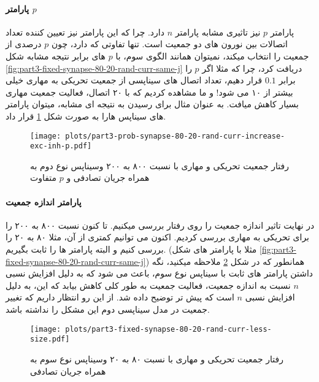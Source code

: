             \paragraph*{پارامتر $p$}
                پارامتر 
                $p$ 
                نیز تاثیری مشابه پارامتر 
                $n$ 
                دارد. چرا که این پارامتر نیز تعیین کننده تعداد اتصالات بین نورون های دو جمعیت است. تنها تفاوتی که دارد، چون 
                $p$ 
                درصدی از جمعیت را انتخاب میکند، نمیتوان همانند الگوی سوم، با 
                $p$ 
                های برابر نتیجه مشابه شکل
                \ref{fig:part3-fixed-synapse-80-20-rand-curr-same-j}
                دریافت کرد، چرا که مثلا اگر 
                $p$ 
                را برابر 
                $0.1$ 
                قرار دهیم، تعداد اتصال های سیناپسی از جمعیت تحریکی به مهاری خیلی بیشتر از ۱۰ می شود! و ما مشاهده کردیم که با ۲۰ اتصال، فعالیت جمعیت مهاری بسیار کاهش میافت. به عنوان مثال برای رسیدن به نتیجه ای مشابه، میتوان پارامتر های سیناپس هارا به صورت شکل 
                \ref{fig:part3-prob-synapse-80-20-rand-curr-increase-exc-inh-p}
                قرار داد.
                \begin{figure}[!ht]
                    \centering
                    \texttt{[image: plots/part3-prob-synapse-80-20-rand-curr-increase-exc-inh-p.pdf]} 
                    \caption{رفتار جمعیت تحریکی و مهاری با نسبت ۸۰۰ به ۲۰۰ وسیناپس نوع دوم به همراه جریان تصادفی و $p$ متفاوت}
                    \label{fig:part3-prob-synapse-80-20-rand-curr-increase-exc-inh-p}
                \end{figure}

            \paragraph*{پارامتر اندازه جمعیت}
                در نهایت تاثیر اندازه جمعیت را روی رفتار بررسی میکنیم. تا کنون نسبت ۸۰۰ به ۲۰۰ را برای تحریکی به مهاری بررسی کردیم. اکنون می توانیم کمتری از آن، مثلا ۸۰ به ۲۰ را بررسی کنیم و البته پارامتر ها را ثابت بگیریم.
                (مثلا با پارامتر های شکل 
                \ref{fig:part3-fixed-synapse-80-20-rand-curr-same-j})
                همانطور که در شکل 
                \ref{fig:part3-fixed-synapse-80-20-rand-curr-less-size}
                ملاحظه میکنید، نگه داشتن پارامتر های ثابت با سیناپس نوع سوم، باعث می شود که به دلیل افزایش نسبی 
                $n$ 
                نسبت به اندازه جمعیت، فعالیت جمعیت به طور کلی کاهش بیابد که این، به دلیل افزایش نسبی
                $n$ 
                است که پیش تر توضیح داده شد.
                از این رو انتظار داریم که تغییر جمعیت در مدل سیناپسی دوم این مشکل را نداشته باشد.
                \begin{figure}[!ht]
                    \centering
                    \texttt{[image: plots/part3-fixed-synapse-80-20-rand-curr-less-size.pdf]} 
                    \caption{رفتار جمعیت تحریکی و مهاری با نسبت ۸۰ به ۲۰ وسیناپس نوع سوم به همراه جریان تصادفی}
                    \label{fig:part3-fixed-synapse-80-20-rand-curr-less-size}
                \end{figure}
